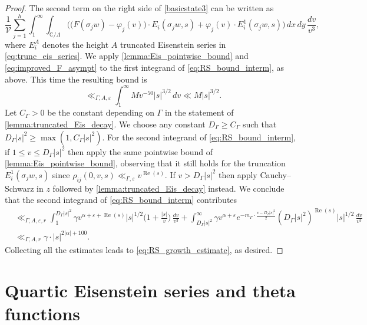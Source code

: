 \documentclass[12pt,reqno]{amsart}
\numberwithin{equation}{section}
\renewcommand{\Re}{\operatorname{Re}}
\newcommand{\C}{\mathbb{C}}
\begin{document}
\begin{proof}
    The second term on the right side of \eqref{basicstate3} can be written as 
    \begin{equation}\label{eq:RS_bound_interm}
        \frac{1}{\mathcal{V}} \sum_{j=1}^{h} \int_{1}^\infty \int_{\C/\Lambda} \Big( \big(F(\sigma_{j} w) - \varphi_{j}(v)\big) \cdot E_i(\sigma_j w, s) + \varphi_{j}(v) \cdot E_i^1(\sigma_{j}w,s) \Big) \, dx \, dy \, \frac{dv}{v^3} ,
    \end{equation}
    where $E_i^{A}$ denotes the height $A$ truncated Eisenstein series in \eqref{eq:trunc_eis_series}.
    We apply \cref{lemma:Eis_pointwise_bound} and \eqref{eq:improved_F_asympt} to the first integrand of \eqref{eq:RS_bound_interm}, as above. This time the resulting bound is 
    \begin{equation*}
        \ll_{\Gamma, A, \varepsilon} \int_{1}^\infty M v^{-50} |{s}|^{3/2} \, dv \ll M |{s}|^{3/2}.
    \end{equation*}
    Let $C_{\Gamma}> 0$ be the constant depending on $\Gamma$ in the statement of \cref{lemma:truncated_Eis_decay}. 
    We choose any constant $D_{\Gamma} \geq C_{\Gamma}$ such that $D_{\Gamma}|s|^2 \geq \max(1,C_{\Gamma}|s|^2)$. 
   For the second integrand of \eqref{eq:RS_bound_interm}, if $1 \leq v \leq D_{\Gamma} |s|^2$ then apply the same pointwise bound of \cref{lemma:Eis_pointwise_bound}, observing that it still holds for the truncation $E_i^1(\sigma_jw, s)$ since $\rho_{ij}(0, v, s) \ll_{\Gamma, \varepsilon} v^{\Re(s)}$. If $v >D_{\Gamma} |s|^2$ then apply Cauchy--Schwarz in $z$ followed by \cref{lemma:truncated_Eis_decay} instead. We conclude that the second integrand of \eqref{eq:RS_bound_interm} contributes
    \begin{align*}
        &\ll_{\Gamma, A, \varepsilon,r} \int_1^{D_{\Gamma} |s|^2} \gamma v^{\alpha+\varepsilon + \Re(s)} |{s}|^{1/2} \Big(1 + \frac{|{s}|}{v}\Big) \, \frac{dv}{v^3} +
         \int_{D_{\Gamma} |{s}|^2}^\infty \gamma v^{\alpha+\varepsilon} e^{-m_\Gamma \cdot \frac{v - D_{\Gamma}|{s}|^2}{2}}(D_{\Gamma} |{s}|^2)^{\Re(s)} |{s}|^{1/2} \,  \frac{dv}{v^3} \\
        & \ll_{\Gamma, A,r} \gamma \cdot |{s}|^{2|{\alpha}| + 100} .
    \end{align*} 
    Collecting all the estimates leads to \eqref{eq:RS_growth_estimate}, as desired.
\end{proof}



\section{Quartic Eisenstein series and theta functions}
\end{document}
